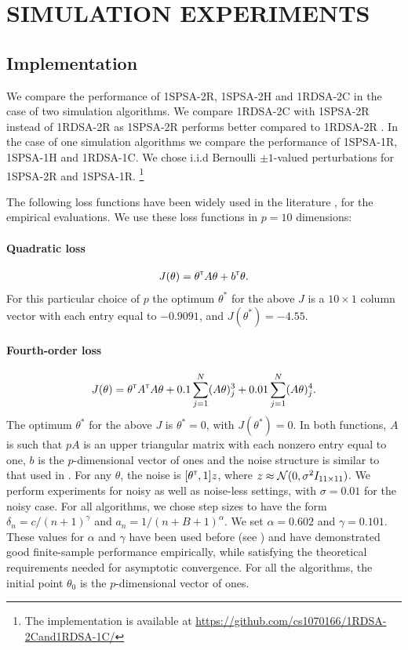 \section{SIMULATION EXPERIMENTS}
\label{sec:expts}
\subsection{Implementation}
We compare the performance of 1SPSA-2R, 1SPSA-2H and 1RDSA-2C in the case of 
two simulation algorithms. We compare 1RDSA-2C with 1SPSA-2R instead of 1RDSA-2R as 1SPSA-2R performs 
better compared to 1RDSA-2R \cite{chin1997comparative}. 
In the case of one simulation algorithms we compare the 
performance of 1SPSA-1R, 1SPSA-1H and 1RDSA-1C. 
We chose i.i.d Bernoulli $\pm 1$-valued perturbations for 1SPSA-2R and 1SPSA-1R.
\footnote{The implementation is available at 
\url{https://github.com/cs1070166/1RDSA-2Cand1RDSA-1C/}}

The following loss functions have been widely used in the literature \cite{spall_adaptive}, 
\cite{reddy2016improved} for the empirical evaluations. 
We use these loss functions in $p=10$ dimensions:
\paragraph{Quadratic loss}
\begin{align}
J(\theta) = \theta^\mathsf{\scriptscriptstyle T} A \theta + b^\mathsf{\scriptscriptstyle T} \theta. \label{eq:quadratic}
\end{align} 
For this particular choice of $p$ the optimum $\theta^*$ for the above $J$ is 
a $10 \times 1$ column vector with each entry equal to 
$-0.9091$, and $J(\theta^*) = -4.55$.

\paragraph{Fourth-order loss}
\begin{align} 
J(\theta) = \theta ^\mathsf{\scriptscriptstyle T} A^\mathsf{\scriptscriptstyle T} A\theta+0.1 \sum_{j=1}^N (A\theta)^3_j+0.01 \sum_{j=1}^N (A\theta)^4_j.\label{eq:4thorder}
 \end{align} 
The optimum $\theta^*$ for the above $J$ is $\theta^*=0$, with $J(\theta^*) = 0$. 
In both functions, $A$ is such that $pA$ is an upper triangular matrix with each 
nonzero entry equal to one, $b$ is the $p$-dimensional vector of ones and 
the noise structure is similar to that used in \cite{spall_adaptive}. 
For any $\theta$, the noise is $[\theta^\mathsf{\scriptscriptstyle T}, 1]z$, where $z \approx \mathcal{N}(0,\sigma^2 I_{11\times11})$.
We perform experiments for noisy as well as noise-less settings, with $\sigma=0.01$ for
the noisy case. 
For all algorithms, we chose step sizes to have the form 
$\delta_n = c/(n+1)^{\gamma}$ and $a_n = 1/(n+B+1)^{\alpha}$.
We set $\alpha=0.602$ and $\gamma=0.101$.
These values for $\alpha$ and $\gamma$ have been used  before (see 
\cite{spall_adaptive}) and have demonstrated good finite-sample performance 
empirically, while satisfying the theoretical requirements needed for asymptotic 
convergence.  For all the algorithms, the initial point $\theta_0$ is the 
$p$-dimensional vector of ones.
